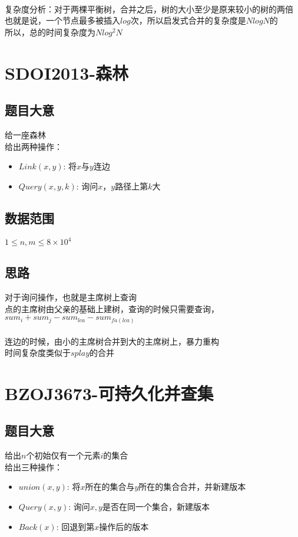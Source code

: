 \documentclass{ctexart}
\numberwithin{equation}{section}
\begin{document}
\begin{flushleft}
  ~\\
  复杂度分析：对于两棵平衡树，合并之后，树的大小至少是原来较小的树的两倍\\
  也就是说，一个节点最多被插入$log$次，所以启发式合并的复杂度是$NlogN$的\\
  所以，总的时间复杂度为$Nlog^2N$\\
  
  \newpage

  \section{SDOI2013-森林}
  \subsection{题目大意}
  给一座森林\\
  给出两种操作：\\
  \begin{itemize}
  \item $Link(x,y)$: 将$x$与$y$连边
  \item $Query(x,y,k)$: 询问$x$，$y$路径上第$k$大
  \end{itemize}
  \subsection{数据范围}
  $1\le n,m \le 8\times 10^4$
  \subsection{思路}
  对于询问操作，也就是主席树上查询\\
  点的主席树由父亲的基础上建树，查询的时候只需要查询，$sum_i+sum_j-sum_{lca}-sum_{fa(lca)}$\\
  ~\\
  连边的时候，由小的主席树合并到大的主席树上，暴力重构\\
  时间复杂度类似于$splay$的合并\\
  \newpage

  \section{BZOJ3673-可持久化并查集}
  \subsection{题目大意}
  给出$n$个初始仅有一个元素$i$的集合\\
  给出三种操作：\\
  \begin{itemize}
  \item $union(x,y)$: 将$x$所在的集合与$y$所在的集合合并，并新建版本
  \item $Query(x,y)$: 询问$x,y$是否在同一个集合，新建版本
  \item $Back(x)$: 回退到第$x$操作后的版本
  \end{itemize}

\end{flushleft}
\end{document}
